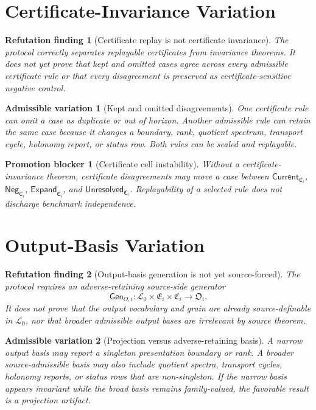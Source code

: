 \documentclass[11pt]{article}
\newcommand{\Lang}{\mathcal{L}_{0}}
\newcommand{\EnumFam}{\mathfrak{E}}
\newcommand{\CertFam}{\mathfrak{C}}
\newcommand{\OutFam}{\mathfrak{O}}
\newcommand{\Current}{\mathsf{Current}}
\newcommand{\Neg}{\mathsf{Neg}}
\newcommand{\Expand}{\mathsf{Expand}}
\newcommand{\Unres}{\mathsf{Unresolved}}
\newtheorem{finding}{Refutation finding}
\newtheorem{variation}{Admissible variation}
\newtheorem{blocker}{Promotion blocker}
\begin{document}
\section{Certificate-Invariance Variation}

\begin{finding}[Certificate replay is not certificate invariance]
The protocol correctly separates replayable certificates from invariance
theorems. It does not yet prove that kept and omitted cases agree across
every admissible certificate rule or that every disagreement is preserved as
certificate-sensitive negative control.
\end{finding}

\begin{variation}[Kept and omitted disagreements]
One certificate rule can omit a case as duplicate or out of horizon. Another
admissible rule can retain the same case because it changes a boundary,
rank, quotient spectrum, transport cycle, holonomy report, or status row.
Both rules can be sealed and replayable.
\end{variation}

\begin{blocker}[Certificate cell instability]
Without a certificate-invariance theorem, certificate disagreements may
move a case between \(\Current_{\CertFam_i}\), \(\Neg_{\CertFam_i}\),
\(\Expand_{\CertFam_i}\), and \(\Unres_{\CertFam_i}\). Replayability of a
selected rule does not discharge benchmark independence.
\end{blocker}

\section{Output-Basis Variation}

\begin{finding}[Output-basis generation is not yet source-forced]
The protocol requires an adverse-retaining source-side generator
\[
\mathsf{Gen}_{O,i}:\Lang\times\EnumFam_i\times\CertFam_i\to\OutFam_i .
\]
It does not prove that the output vocabulary and grain are already
source-definable in \(\Lang\), nor that broader admissible output bases are
irrelevant by source theorem.
\end{finding}

\begin{variation}[Projection versus adverse-retaining basis]
A narrow output basis may report a singleton presentation boundary or rank.
A broader source-admissible basis may also include quotient spectra,
transport cycles, holonomy reports, or status rows that are non-singleton.
If the narrow basis appears invariant while the broad basis remains
family-valued, the favorable result is a projection artifact.
\end{variation}
\end{document}
